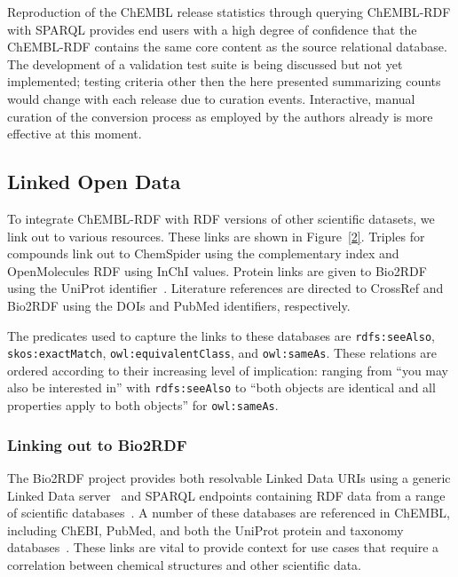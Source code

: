 \documentclass[10pt]{bmc_article}
\newenvironment{bmcformat}{\begin{raggedright}\baselineskip20pt\sloppy\setboolean{publ}{false}}{\end{raggedright}\baselineskip20pt\sloppy}
\begin{document}
\begin{bmcformat}
Reproduction of the ChEMBL release statistics through querying ChEMBL-RDF with SPARQL 
provides end users with a high degree of confidence that the ChEMBL-RDF contains the same 
core content as the source relational database. The development of a validation test suite
is being discussed but not yet implemented; testing criteria other then the here presented
summarizing counts would change with each release due to curation events. Interactive,
manual curation of the conversion process as employed by the authors already is more effective
at this moment.

\subsection*{Linked Open Data}

To integrate ChEMBL-RDF with RDF versions of other scientific datasets, we link out to various resources.
These links are shown in Figure~\ref{2}. Triples for compounds link out to ChemSpider 
using the complementary index and OpenMolecules RDF using InChI values. Protein links are given to Bio2RDF~\cite{Belleau2008}
using the UniProt identifier~\cite{TheUniProtConsortium2010}. Literature references are directed to CrossRef and Bio2RDF 
using the DOIs and PubMed identifiers, respectively.

The predicates used to capture the links to these databases are
\verb+rdfs:seeAlso+, \verb+skos:exactMatch+, \verb+owl:equivalentClass+, and \verb+owl:sameAs+. 
These relations are ordered according to their increasing level of implication:
ranging from ``you may also be interested in'' with \verb+rdfs:seeAlso+ to
``both objects are identical  and all properties apply to both objects'' for
\verb+owl:sameAs+.

\subsubsection*{Linking out to Bio2RDF}

The Bio2RDF project provides both resolvable Linked Data URIs using a generic Linked Data
server~\cite{Ansell2011} and SPARQL endpoints containing RDF data from a range of scientific databases~\cite{Belleau2008}.
A number of these databases are referenced in ChEMBL, including ChEBI, PubMed, and both the
UniProt protein and taxonomy databases~\cite{TheUniProtConsortium2010}. These links are
vital to provide context for use cases that require a correlation between chemical
structures and other scientific data. 


\end{bmcformat}
\end{document}
